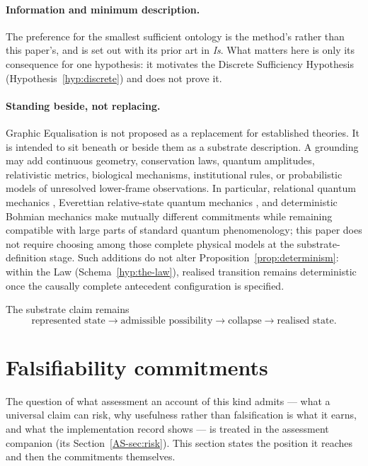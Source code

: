 \documentclass[11pt,a4paper]{article}
\theoremstyle{remark}\newtheorem{remark}[definition]{Remark}
\begin{document}
\paragraph{Information and minimum description.} The preference for the smallest sufficient ontology is the method's rather than this paper's, and is set out with its prior art in \emph{Is}. What matters here is only its consequence for one hypothesis: it motivates the Discrete Sufficiency Hypothesis (Hypothesis~\ref{hyp:discrete}) and does not prove it.

\paragraph{Standing beside, not replacing.} Graphic Equalisation is not proposed as a replacement for established theories. It is intended to sit beneath or beside them as a substrate description. A grounding may add continuous geometry, conservation laws, quantum amplitudes, relativistic metrics, biological mechanisms, institutional rules, or probabilistic models of unresolved lower-frame observations. In particular, relational quantum mechanics \citep{rovelli1996}, Everettian relative-state quantum mechanics \citep{everett1957}, and deterministic Bohmian mechanics \citep{bohm1952} make mutually different commitments while remaining compatible with large parts of standard quantum phenomenology; this paper does not require choosing among those complete physical models at the substrate-definition stage. Such additions do not alter Proposition~\ref{prop:determinism}: within the Law (Schema~\ref{hyp:the-law}), realised transition remains deterministic once the causally complete antecedent configuration is specified.

The substrate claim remains
\[
\boxed{\text{represented state}\rightarrow\text{admissible possibility}\rightarrow\text{collapse}\rightarrow\text{realised state}.}
\]

\section{Falsifiability commitments}\label{sec:falsifiability}
The question of what assessment an account of this kind admits --- what a universal claim can risk, why
usefulness rather than falsification is what it earns, and what the implementation record shows --- is
treated in the assessment companion (its Section~\ref{AS-sec:risk}). This section states the position it reaches and then the
commitments themselves.
\end{document}
